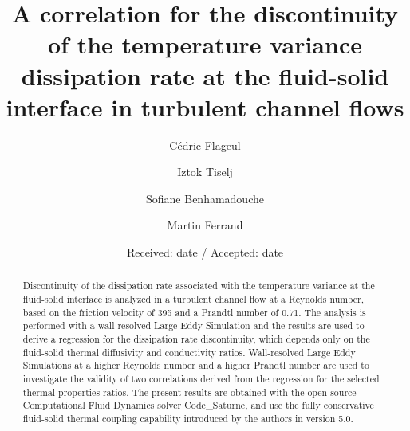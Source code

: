 \documentclass{svjour3}                     %
\begin{document}
\title{A correlation for the discontinuity of the temperature variance dissipation rate at the fluid-solid interface in turbulent channel flows%
}


\author{C\'edric Flageul \and
        Iztok Tiselj \and
        Sofiane Benhamadouche \and
        Martin Ferrand
}



\date{Received: date / Accepted: date}

\maketitle

\begin{abstract}
Discontinuity of the dissipation rate associated with the temperature variance at the fluid-solid interface is analyzed in a turbulent channel flow at a Reynolds number, based on the friction velocity of 395 and a Prandtl number of 0.71.
The analysis is  performed with a wall-resolved Large Eddy Simulation and the results are used to derive a regression for the dissipation rate discontinuity, which depends only on the fluid-solid thermal diffusivity and conductivity ratios.
Wall-resolved Large Eddy Simulations at a higher Reynolds number and a higher Prandtl number are used to investigate the validity of two correlations derived from the regression for the selected thermal properties ratios.
The present results are obtained with the open-source Computational Fluid Dynamics solver {\selectfont Code\_Saturne}, and use the fully conservative fluid-solid thermal coupling capability introduced by the authors in version 5.0.
\end{abstract}
\end{document}
